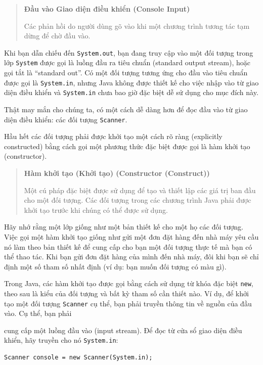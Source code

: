 \begin{quote}
\textbf{Đầu vào Giao diện điều khiển (Console Input)}

Các phản hồi do người dùng gõ vào khi một chương trình tương tác tạm
dừng để chờ đầu vào.
\end{quote}

Khi bạn dẫn chiếu đến \texttt{System.out}, bạn đang truy cập vào một đối
tượng trong lớp \texttt{System} được gọi là luồng đầu ra tiêu chuẩn
(standard output stream), hoặc gọi tắt là ``standard out''. Có một đối
tượng tương ứng cho đầu vào tiêu chuẩn được gọi là \texttt{System.in},
nhưng Java không được thiết kế cho việc nhập vào từ giao diện điều khiển
và \texttt{System.in} chưa bao giờ đặc biệt dễ sử dụng cho mục đích này.

Thật may mắn cho chúng ta, có một cách dễ dàng hơn để đọc đầu vào từ
giao diện điều khiển: các đối tượng \texttt{Scanner}.

Hầu hết các đối tượng phải được khởi tạo một cách rõ ràng (explicitly
constructed) bằng cách gọi một phương thức đặc biệt được gọi là hàm khởi
tạo (constructor).

\begin{quote}
\textbf{Hàm khởi tạo (Khởi tạo) (Constructor (Construct))}

Một cú pháp đặc biệt được sử dụng để tạo và thiết lập các giá trị ban
đầu cho một đối tượng. Các đối tượng trong các chương trình Java phải
được khởi tạo trước khi chúng có thể được sử dụng.
\end{quote}

Hãy nhớ rằng một lớp giống như một bản thiết kế cho một họ các đối
tượng. Việc gọi một hàm khởi tạo giống như gửi một đơn đặt hàng đến nhà
máy yêu cầu nó làm theo bản thiết kế để cung cấp cho bạn một đối tượng
thực tế mà bạn có thể thao tác. Khi bạn gửi đơn đặt hàng của mình đến
nhà máy, đôi khi bạn sẽ chỉ định một số tham số nhất định (ví dụ: bạn
muốn đối tượng có màu gì).

Trong Java, các hàm khởi tạo được gọi bằng cách sử dụng từ khóa đặc biệt
\texttt{new}, theo sau là kiểu của đối tượng và bất kỳ tham số cần thiết
nào. Ví dụ, để khởi tạo một đối tượng \texttt{Scanner} cụ thể, bạn phải
truyền thông tin về nguồn của đầu vào. Cụ thể, bạn phải

cung cấp một luồng đầu vào (input stream). Để đọc từ cửa sổ giao diện
điều khiển, hãy truyền cho nó \texttt{System.in}:

\begin{verbatim}
Scanner console = new Scanner(System.in);
\end{verbatim}

